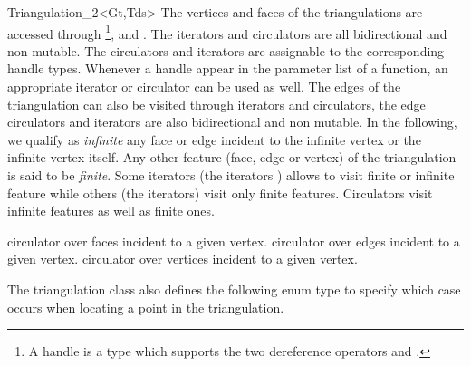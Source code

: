 \begin{ccClassTemplate}{Triangulation_2<Gt,Tds>}
\ccThreeToTwo
The vertices and faces of the triangulations are accessed through 
\footnote{ A handle is a type which supports the two
dereference operators  and .}, 
 and . 
The iterators and circulators
are all bidirectional and non mutable.
The circulators and iterators are assignable to the 
corresponding handle types. Whenever a handle appear in the parameter 
list of a function, an appropriate iterator or circulator can be used as well.
The edges of the triangulation can also be visited through iterators
and circulators,
the edge circulators and iterators
are also bidirectional and non mutable.
In the following, we qualify as {\it infinite} any face or edge 
incident  to the infinite vertex or the infinite vertex itself.
 Any other feature (face, edge or vertex) of the triangulation is said 
to be {\it finite}.
Some iterators (the  iterators ) allows to visit finite or 
infinite feature while others (the  iterators) visit only
finite features. Circulators visit infinite features as well as finite 
ones.

\ccGlue
{}


\ccGlue
{}
\ccGlue
{}

\ccGlue
{}
\ccGlue
{}




{circulator over faces incident to a given vertex.}
\ccGlue
{}
{circulator over edges incident to a given vertex.}
\ccGlue
{}
{circulator over vertices incident to a given vertex.}

The triangulation class also defines the following enum type to specify
which case occurs when locating a point in the triangulation.



\end{ccClassTemplate}
